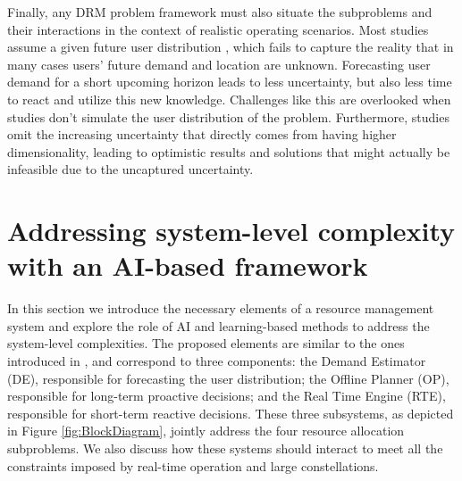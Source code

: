 \documentclass[letterpaper]{article} %
\begin{document}
Finally, any DRM problem framework must also situate the subproblems and their interactions in the context of realistic operating scenarios.  Most studies assume a given future user distribution \cite{Aravanis2015, Cocco2018}, which fails to capture the reality that in many cases users' future demand and location are unknown. Forecasting user demand for a short upcoming horizon leads to less uncertainty, but also less time to react and utilize this new knowledge. Challenges like this are overlooked when studies don't simulate the user distribution of the problem. Furthermore, studies omit the increasing uncertainty that directly comes from having higher dimensionality, leading to optimistic results and solutions that might actually be infeasible due to the uncaptured uncertainty.






\section{Addressing system-level complexity with an AI-based framework}
\label{sec:4}


In this section we introduce the necessary elements of a resource management system and explore the role of AI and learning-based methods to address the system-level complexities. The proposed elements are similar to the ones introduced in \cite{Guerster2019}, and correspond to three components: the Demand Estimator (DE), responsible for forecasting the user distribution; the Offline Planner (OP), responsible for long-term proactive decisions; and the Real Time Engine (RTE), responsible for short-term reactive decisions. These three subsystems, as depicted in Figure \ref{fig:BlockDiagram}, jointly address the four resource allocation subproblems. We also discuss how these systems should interact to meet all the constraints imposed by real-time operation and large constellations.
\end{document}
